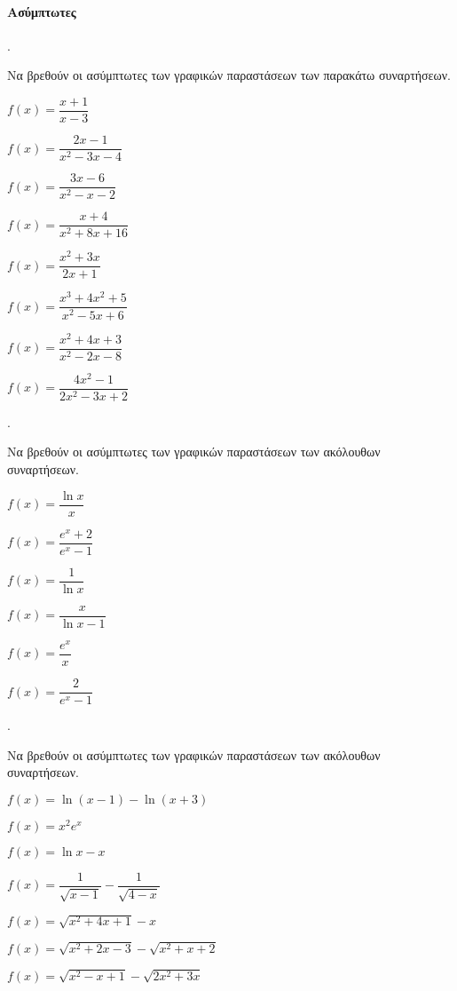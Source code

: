 \documentclass[11pt,a4paper,twocolumn]{article}
\newcounter{askhsh}
\newcommand{\askhsh}{\large\theaskhsh.\ \addtocounter{askhsh}{1}}
\begin{document}
\paragraph{Ασύμπτωτες}
\askhsh Να βρεθούν οι ασύμπτωτες των γραφικών παραστάσεων των παρακάτω συναρτήσεων.
\begin{multicols}{2}
\begin{alist}
\item $f(x)=\dfrac{x+1}{x-3}$
\item $f(x)=\dfrac{2x-1}{x^2-3x-4}$
\item $f(x)=\dfrac{3x-6}{x^2-x-2}$
\item $f(x)=\dfrac{x+4}{x^2+8x+16}$
\item $f(x)=\dfrac{x^2+3x}{2x+1}$
\item $f(x)=\dfrac{x^3+4x^2+5}{x^2-5x+6}$
\item $f(x)=\dfrac{x^2+4x+3}{x^2-2x-8}$
\item $f(x)=\dfrac{4x^2-1}{2x^2-3x+2}$
\end{alist}
\end{multicols}
\askhsh Να βρεθούν οι ασύμπτωτες των γραφικών παραστάσεων των ακόλουθων συναρτήσεων.
\begin{multicols}{2}
\begin{alist}
\item $f(x)=\dfrac{\ln{x}}{x}$
\item $f(x)=\dfrac{e^x+2}{e^x-1}$
\item $f(x)=\dfrac{1}{\ln{x}}$
\item $f(x)=\dfrac{x}{\ln{x}-1}$
\item $f(x)=\dfrac{e^x}{x}$
\item $f(x)=\dfrac{2}{e^x-1}$
\end{alist}
\end{multicols}
\askhsh Να βρεθούν οι ασύμπτωτες των γραφικών παραστάσεων των ακόλουθων συναρτήσεων.
\begin{alist}
\item $f(x)=\ln{(x-1)}-\ln{(x+3)}$
\begin{multicols}{2}
\item $f(x)=x^2e^x$
\item $f(x)=\ln{x}-x$
\end{multicols}
\item $f(x)=\dfrac{1}{\sqrt{x-1}}-\dfrac{1}{\sqrt{4-x}}$
\item $f(x)=\sqrt{x^2+4x+1}-x$
\item $f(x)=\sqrt{x^2+2x-3}-\sqrt{x^2+x+2}$
\item $f(x)=\sqrt{x^2-x+1}-\sqrt{2x^2+3x}$
\end{alist}
\end{document}
